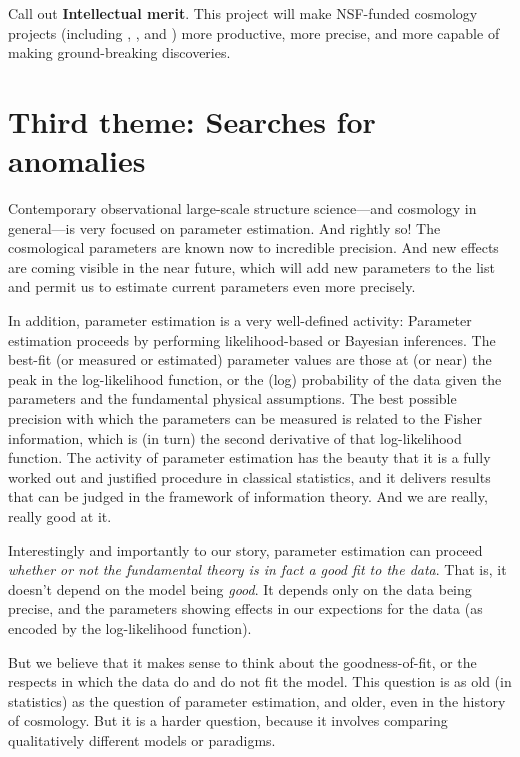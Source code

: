 \documentclass[12pt, fullpage, letterpaper]{article}
\begin{document}
Call out \textbf{Intellectual merit}.
This project will make NSF-funded cosmology projects (including
\SDSSIV, \DESI, and \LSST) more productive, more precise, and more
capable of making ground-breaking discoveries.



\section{Third theme: Searches for anomalies}

Contemporary observational large-scale structure science---and
cosmology in general---is very focused on parameter estimation.
And rightly so!
The cosmological parameters are known now to incredible precision.
And new effects are coming visible in the near future, which will add
new parameters to the list and permit us to estimate current
parameters even more precisely.

In addition, parameter estimation is a very well-defined activity:
Parameter estimation proceeds by performing likelihood-based or
Bayesian inferences.
The best-fit (or measured or estimated) parameter values are those at
(or near) the peak in the log-likelihood function, or the (log)
probability of the data given the parameters and the fundamental
physical assumptions.
The best possible precision with which the parameters can be measured
is related to the Fisher information, which is (in turn) the second
derivative of that log-likelihood function.
The activity of parameter estimation has the beauty that it is a fully
worked out and justified procedure in classical statistics, and it
delivers results that can be judged in the framework of information
theory.
And we are really, really good at it.

Interestingly and importantly to our story,
parameter estimation can proceed \emph{whether or not the fundamental theory
is in fact a good fit to the data}.
That is, it doesn't depend on the model being \emph{good}.
It depends only on the data being precise, and the parameters showing
effects in our expections for the data (as encoded by the log-likelihood function).

But we believe that it makes sense to think about the goodness-of-fit,
or the respects in which the data do and do not fit the model.
This question is as old (in statistics) as the question of parameter
estimation, and older, even in the history of cosmology.
But it is a harder question, because it involves comparing
qualitatively different models or paradigms.
\end{document}
